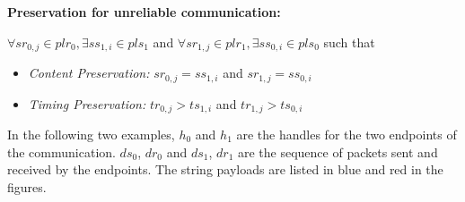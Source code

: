 \textbf{Preservation for unreliable communication:}

$\forall sr_{0,j} \in plr_{0}, \exists ss_{1,i} \in pls_{1}$ and $\forall sr_{1,j} \in plr_{1}, \exists ss_{0,i} \in pls_{0}$ such that
\begin{itemize}
 \item \textit{ Content Preservation:}  $sr_{0,j} = ss_{1,i}$ and $sr_{1,j} = ss_{0,i}$ 
 \item \textit{Timing Preservation:}    $tr_{0,j} > ts_{1,i}$ and $tr_{1,j} > ts_{0,i}$
\end{itemize}

In the following two examples, $h_{0}$ and $h_{1}$ are the handles for the two endpoints of the communication. $ds_{0}$, $dr_{0}$ and $ds_{1}$, $dr_{1}$ are the sequence of packets sent and received by the endpoints. The string payloads are listed in blue and red in the figures. 

